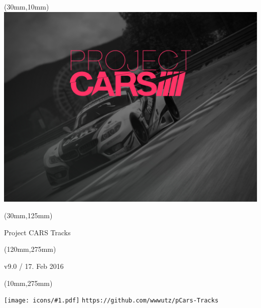 \documentclass[oneside, a4paper, 12pt]{book}
\newlength{\HT}
\newcommand*{\ICON}[2]{\settoheight{\HT}{\hbox{#2}}\mbox{\texttt{[image: icons/\#1.pdf]}}}
\begin{document}
\selectfont
\textblockorigin{0cm}{0cm}

\newlength{\Logo}
\setlength{\Logo}{210mm-60mm}
\begin{textblock*}{\Logo}(30mm,10mm)%
\includegraphics[width=\Logo]{pcars-main.png}
\end{textblock*}

\begin{textblock*}{\Logo}(30mm,125mm)%
\begin{center}\Huge{Project CARS Tracks}\end{center}
\end{textblock*}

\begin{textblock*}{90mm}(120mm,275mm)%
\begin{center}\Huge{v9.0 / 17. Feb 2016}\end{center}
\end{textblock*}

\begin{textblock*}{90mm}(10mm,275mm)%
\begin{center}\ICON{fa-github}{X} \tt{https://github.com/wwwutz/pCars-Tracks}\end{center}
\end{textblock*}


\null\newpage


\end{document}
